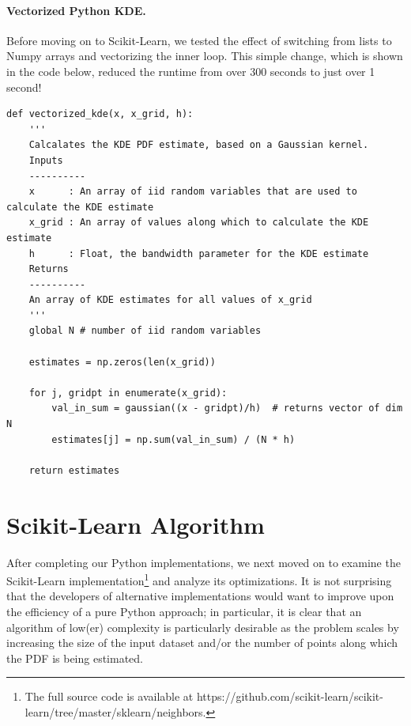\documentclass[11pt]{article}
\begin{document}
\paragraph{Vectorized Python KDE.} Before moving on to Scikit-Learn, we tested the effect of switching from lists to Numpy arrays and vectorizing the inner loop. This simple change, which is shown in the code below, reduced the runtime from over 300 seconds to just over 1 second!

\begin{framed}
\begin{singlespacing}
\begin{scriptsize}
\begin{verbatim}
def vectorized_kde(x, x_grid, h):
    '''
    Calcalates the KDE PDF estimate, based on a Gaussian kernel.
    Inputs
    ----------
    x      : An array of iid random variables that are used to calculate the KDE estimate
    x_grid : An array of values along which to calculate the KDE estimate
    h      : Float, the bandwidth parameter for the KDE estimate
    Returns
    ----------
    An array of KDE estimates for all values of x_grid
    '''    
    global N # number of iid random variables

    estimates = np.zeros(len(x_grid))
    
    for j, gridpt in enumerate(x_grid):
        val_in_sum = gaussian((x - gridpt)/h)  # returns vector of dim N
        estimates[j] = np.sum(val_in_sum) / (N * h)
    
    return estimates
\end{verbatim}
\end{scriptsize}
\end{singlespacing}
\end{framed}

\newpage

\section{Scikit-Learn Algorithm}

After completing our Python implementations, we next moved on to examine the Scikit-Learn implementation\footnote{The full source code is available at https://github.com/scikit-learn/scikit-learn/tree/master/sklearn/neighbors.} and analyze its optimizations. It is not surprising that the developers of alternative implementations would want to improve upon the efficiency of a pure Python approach; in particular, it is clear that an algorithm of low(er) complexity is particularly desirable as the problem scales by increasing the size of the input dataset and/or the number of points along which the PDF is being estimated. \medskip
\end{document}
